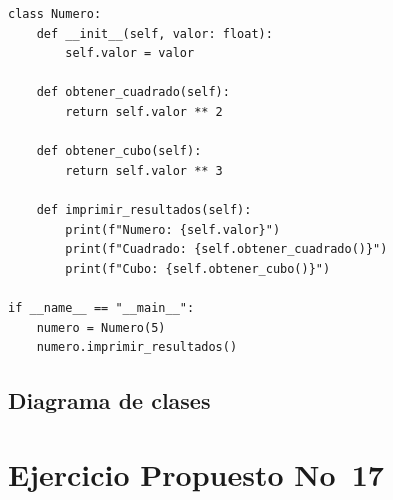 \documentclass[12pt,a4paper]{article}
\begin{document}
\begin{lstlisting}[style=pythonstyle, caption={Cuadrado y Cubo -- ejercicio\_propuesto14\_potencias.py}]
class Numero:
    def __init__(self, valor: float):
        self.valor = valor

    def obtener_cuadrado(self):
        return self.valor ** 2

    def obtener_cubo(self):
        return self.valor ** 3

    def imprimir_resultados(self):
        print(f"Numero: {self.valor}")
        print(f"Cuadrado: {self.obtener_cuadrado()}")
        print(f"Cubo: {self.obtener_cubo()}")

if __name__ == "__main__":
    numero = Numero(5)
    numero.imprimir_resultados()
\end{lstlisting}

\subsection{Diagrama de clases}

\begin{figure}[H]
\centering
{}
\end{figure}

\newpage
\section{Ejercicio Propuesto No~17}
\end{document}

